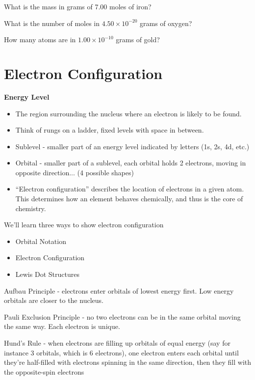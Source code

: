 \documentclass[../hchem.tex]{subfiles}
\begin{document}
\ex What is the mass in grams of 7.00 moles of iron?

\ex What is the number of moles in $4.50\times 10^{-20}$ grams of oxygen?

\ex How many atoms are in $1.00\times 10^{-10}$ grams of gold?

\section{Electron Configuration}
\textbf{Energy Level}
\begin{itemize}
    \item The region surrounding the nucleus where an electron is likely to be found.
    \item Think of rungs on a ladder, fixed levels with space in between.
    \item Sublevel - smaller part of an energy level indicated by letters (1s, 2s, 4d, etc.)
    \item Orbital - smaller part of a sublevel, each orbital holds 2 electrons, moving in opposite direction... (4 possible shapes)
\end{itemize}

\begin{itemize}
    \item ``Electron configuration'' describes the location of electrons in a given atom. This determines how an element behaves chemically, and thus is the core of chemistry.
\end{itemize}

We'll learn three ways to show electron configuration 
\begin{itemize}
    \item Orbital Notation 
    \item Electron Configuration 
    \item Lewis Dot Structures
\end{itemize}

Aufbau Principle - electrons enter orbitals of lowest energy first. Low energy orbitals are closer to the nucleus.

Pauli Exclusion Principle - no two electrons can be in the same orbital moving the same way. Each electron is unique.

Hund's Rule - when electrons are filling up orbitals of equal energy (say for instance 3 orbitals, which is 6 electrons), one electron enters 
each orbital until they're half-filled with electrons spinning in the same direction, then they fill with the opposite-spin electrons 
\end{document}
